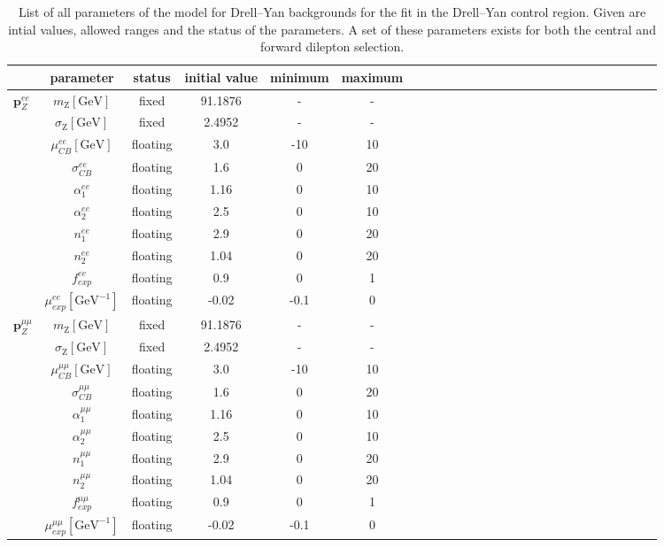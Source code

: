 \begin{table}[htbp]
\begin{center}
 \renewcommand{\arraystretch}{1.3}
 \caption{List of all parameters of the model for Drell--Yan backgrounds for the fit in the Drell--Yan control region. Given are intial values, allowed ranges and the status of the parameters. A set of these parameters exists for both the central and forward dilepton selection.\label{tab:Fit_Par_Overview_Z}}
\begin{tabular}{l|c|c|c|c|ccccccccccccccccccccc}
& parameter & status & initial value & minimum & maximum \\ \hline
\multirow{10}{*}{$\mathbf{p}_{Z}^{ee}$} & $m_{\mathrm{Z}} [\mathrm{GeV}]$ & fixed & 91.1876 & - & - \\ 
& $\sigma_{\mathrm{Z}}  [\mathrm{GeV}]$ & fixed & 2.4952 & - & - \\
& $\mu_{CB}^{ee} [\mathrm{GeV}]$ & floating & 3.0 & -10 & 10 \\ 
& $\sigma_{CB}^{ee}$ & floating & 1.6 & 0 & 20 \\
& $\alpha_{1}^{ee}$ & floating & 1.16 & 0 & 10 \\
& $\alpha_{2}^{ee}$ & floating & 2.5 & 0 & 10 \\
& $n_{1}^{ee}$ & floating & 2.9 & 0 & 20 \\
& $n_{2}^{ee}$ & floating & 1.04 & 0 & 20 \\
& $f_{exp}^{ee}$ & floating & 0.9 & 0 & 1 \\
& $\mu_{exp}^{ee} [\mathrm{GeV}^{-1}]$ & floating & -0.02& -0.1 & 0 \\ \hline
\multirow{10}{*}{$\mathbf{p}_{Z}^{\mu\mu}$} & $m_{\mathrm{Z}} [\mathrm{GeV}]$ & fixed & 91.1876 & - & - \\ 
& $\sigma_{\mathrm{Z}} [\mathrm{GeV}]$  & fixed & 2.4952 & - & - \\
& $\mu_{CB}^{\mu\mu} [\mathrm{GeV}]$ & floating & 3.0 & -10 & 10 \\
&  $\sigma_{CB}^{\mu\mu}$ & floating & 1.6 & 0 & 20 \\
&  $\alpha_{1}^{\mu\mu}$ & floating & 1.16 & 0 & 10 \\
&  $\alpha_{2}^{\mu\mu}$ & floating & 2.5 & 0 & 10 \\
&  $n_{1}^{\mu\mu}$ & floating & 2.9 & 0 & 20 \\
&  $n_{2}^{\mu\mu}$ & floating & 1.04 & 0 & 20 \\
&  $f_{exp}^{\mu\mu}$ & floating & 0.9 & 0 & 1 \\
&  $\mu_{exp}^{\mu\mu} [\mathrm{GeV}^{-1}]$& floating & -0.02 & -0.1 & 0 \\ 
\end{tabular}

\end{center}
\end{table}


